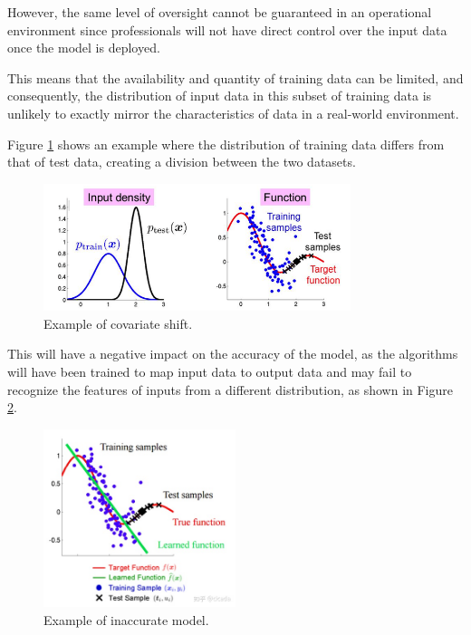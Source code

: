 However, the same level of oversight cannot be guaranteed in an operational environment since professionals will not have direct control over the input data once the model is deployed.  

This means that the availability and quantity of training data can be limited, and consequently, the distribution of input data in this subset of training data is unlikely to exactly mirror the characteristics of data in a real-world environment.

Figure \ref{covariate-shift} shows an example where the distribution of training data differs from that of test data, creating a division between the two datasets.  

\vspace{0.5cm}  
\begin{figure}[H]
    \centering
    \includegraphics[width=0.8\textwidth]{../src/assets/immagine.png} 
    \caption{Example of covariate shift.}
    \label{covariate-shift}
\end{figure}

This will have a negative impact on the accuracy of the model, as the algorithms will have been trained to map input data to output data and may fail to recognize the features of inputs from a different distribution, as shown in Figure \cref{inaccurate-model}.

\begin{figure}[H]
    \centering
    \includegraphics[width=0.5\textwidth]{../src/assets/covariate_shift.png} 
    \caption{Example of inaccurate model.}
    \label{inaccurate-model}
\end{figure}  

